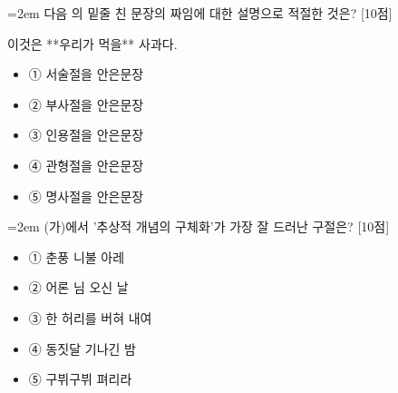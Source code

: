 \documentclass[11pt,a4paper]{article}
\newcommand{\qnum}[1]{%
  \tikz[baseline=(num.base)]{%
    \node[circle, fill=numCircle, text=white, inner sep=0pt,
          minimum size=18pt, font=\small\bfseries] (num) {#1};%
  }%
}
\newcommand{\pts}[1]{%
  \hfill\textcolor{ptsBadge}{[#1점]}%
}
\begin{document}
\vspace{4mm}
\begin{minipage}{\columnwidth}
{\hangindent=2em
\qnum{37}\enspace 다음 의 밑줄 친 문장의 짜임에 대한 설명으로 적절한 것은? \pts{10}
\par}

\vspace{3mm}
\begin{tcolorbox}[bogi]
이것은 **우리가 먹을** 사과다.
\end{tcolorbox}
\vspace{3mm}
\begin{itemize}[leftmargin=2.5em, labelsep=0.3em, label={}, itemsep=4pt, parsep=1pt, topsep=0pt]
  \item ① 서술절을 안은문장
  \item ② 부사절을 안은문장
  \item ③ 인용절을 안은문장
  \item ④ 관형절을 안은문장
  \item ⑤ 명사절을 안은문장
\end{itemize}
\end{minipage}
\vspace{4mm}

\vspace{4mm}
\begin{minipage}{\columnwidth}
{\hangindent=2em
\qnum{38}\enspace (가)에서 '추상적 개념의 구체화'가 가장 잘 드러난 구절은? \pts{10}
\par}

\vspace{3mm}
\begin{itemize}[leftmargin=2.5em, labelsep=0.3em, label={}, itemsep=4pt, parsep=1pt, topsep=0pt]
  \item ① 춘풍 니불 아레
  \item ② 어론 님 오신 날
  \item ③ 한 허리를 버혀 내여
  \item ④ 동짓달 기나긴 밤
  \item ⑤ 구뷔구뷔 펴리라
\end{itemize}
\end{minipage}
\vspace{4mm}
\end{document}
